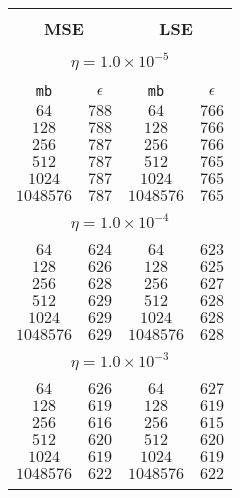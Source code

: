 \documentclass[10pt]{article}
\begin{document}
\begin{center}
\begin{table}[]
\begin{center}
\begin{tabular}{@{}cc|cc@{}}
\hline\\[-11pt]
\hline\\[-6.5pt]
\multicolumn{2}{c}{\bf MSE} & \multicolumn{2}{c}{\bf LSE } \\[5pt]
\hline\\[-11pt]
\multicolumn{4}{c}{$\eta = 1.0\times 10^{-5}$} \\[5pt]
\hline\\[-11pt]
\texttt{mb} & \texttt{$\epsilon$} & \texttt{mb} & \texttt{$\epsilon$} \\[1pt]
$64$ & $788$  & $64$ & $766$ \\  [1pt]
$128$ & $788$   & $128$ & $766$ \\  [1pt]
$256$ & $787$   & $256$ & $766$ \\  [1pt]
$512$ & $787$   & $512$ & $765$ \\  [1pt]
$1024$ & $787$ & $1024$ & $765$ \\  [1pt]
$1048576$ & $787$   & $1048576$ & $765$ \\  [1pt]
\hline\\[-11pt]
\multicolumn{4}{c}{$\eta = 1.0\times 10^{-4}$} \\[5pt]
\hline\\[-11pt]
$64$ & $624$  & $64$ & $623$ \\  [1pt]
$128$ & $626$  & $128$ & $625$ \\  [1pt]
$256$ & $628$  & $256$ & $627$ \\  [1pt]
$512$ & $629$  & $512$ & $628$ \\  [1pt]
$1024$ & $629$  & $1024$ & $628$ \\  [1pt]
$1048576$ & $629$   & $1048576$ & $628$ \\  [1pt]
\hline\\[-11pt]
\multicolumn{4}{c}{$\eta = 1.0\times 10^{-3}$} \\[5pt]
\hline\\[-11pt]
$64$ & $626$  & $64$ & $627$ \\  [1pt]
$128$ & $619$  & $128$ & $619$ \\  [1pt]
$256$ & $616$  & $256$ & $615$ \\  [1pt]
$512$ & $620$  & $512$ & $620$ \\  [1pt]
$1024$ & $619$  & $1024$ & $619$ \\  [1pt]
$1048576$ & $622$   & $1048576$ & $622$ \\  [1pt]
\hline\\[-11pt]


\end{tabular}
\end{center}
\end{table}
\end{center}
\end{document}
